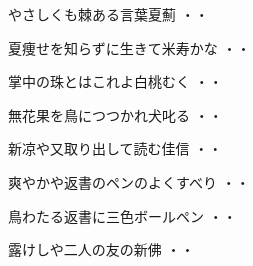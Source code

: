 \vspace{0.4cm}
\begin{shiika}やさしくも棘ある言葉夏薊
\hfill{・・}\end{shiika}
\vspace{0.4cm}
\begin{shiika}夏痩せを知らずに生きて米寿かな
\hfill{・・}\end{shiika}
\vspace{0.4cm}
\begin{shiika}掌中の珠とはこれよ白桃むく
\hfill{・・}\end{shiika}
\vspace{0.4cm}
\begin{shiika}無花果を鳥につつかれ犬叱る
\hfill{・・}\end{shiika}
\vspace{0.4cm}
\begin{shiika}新凉や又取り出して読む佳信
\hfill{・・}\end{shiika}
\vspace{0.4cm}
\begin{shiika}爽やかや返書のペンのよくすべり
\hfill{・・}\end{shiika}
\vspace{0.4cm}
\begin{shiika}鳥わたる返書に三色ボールペン
\hfill{・・}\end{shiika}
\vspace{0.4cm}
\begin{shiika}露けしや二人の友の新佛
\hfill{・・}\end{shiika}
\vspace{0.4cm}

